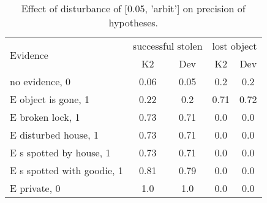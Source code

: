 \begin{table}\begin{tabular}{l|cc|cc}\toprule\multirow{2}{*}{Evidence} & \multicolumn{2}{c}{successful stolen}& \multicolumn{2}{c}{lost object}\\& {K2} & {Dev}& {K2} & {Dev}\\\midrule
no evidence, 0 & 0.06&0.05&0.2&0.2\\E object is gone, 1 & 0.22&0.2&0.71&0.72\\E broken lock, 1 & 0.73&0.71&0.0&0.0\\E disturbed house, 1 & 0.73&0.71&0.0&0.0\\E s spotted by house, 1 & 0.73&0.71&0.0&0.0\\E s spotted with goodie, 1 & 0.81&0.79&0.0&0.0\\E private, 0 & 1.0&1.0&0.0&0.0\\\bottomrule\end{tabular}\caption{Effect of disturbance of [0.05, 'arbit'] on precision of hypotheses.}\end{table}